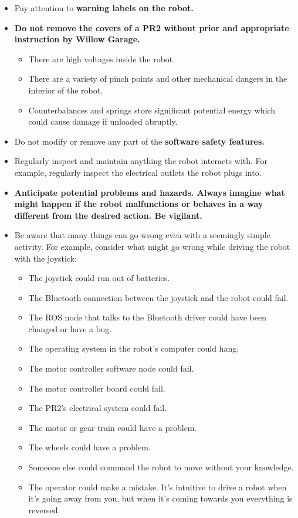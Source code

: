 \begin{itemize}
\begin{itemize}
\end{itemize}
\item Pay attention to \bf{warning labels} on the robot.
\item \bf{Do not remove the covers} of a PR2 without prior and appropriate instruction by Willow Garage.
\begin{itemize}
\item There are high voltages inside the robot.
\item There are a variety of pinch points and other mechanical dangers in the interior of the robot.
\item Counterbalances and springs store significant potential energy which could cause damage if unloaded abruptly.
\end{itemize}
\item Do not modify or remove any part of the \bf{software safety features}.
\item Regularly inspect and maintain anything the robot interacts with.  For example, regularly inspect the electrical outlets the robot plugs into.
\item \bf{Anticipate potential problems} and hazards.  Always imagine what might happen if the robot malfunctions or behaves in a way different from the desired action.  Be vigilant.
\item Be aware that many things can go wrong even with a seemingly simple activity. For example, consider what might go wrong while driving the robot with the joystick:
\begin{itemize}
\item The joystick could run out of batteries.
\item The Bluetooth connection between the joystick and the robot could fail.
\item The ROS node that talks to the Bluetooth driver could have been changed or have a bug.
\item The operating system in the robot's computer could hang.
\item The motor controller software node could fail.
\item The motor controller board could fail.
\item The PR2's electrical system could fail.
\item The motor or gear train could have a problem.
\item The wheels could have a problem.
\item Someone else could command the robot to move without your knowledge.
\item The operator could make a mistake. It's intuitive to drive a robot when it's going away from you, but when it's coming towards you everything is reversed.
\end{itemize}
\end{itemize}

